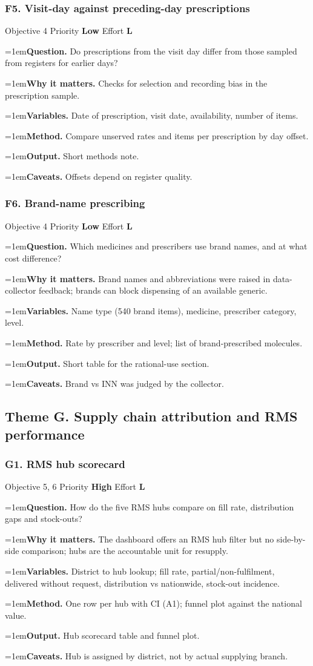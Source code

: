 \documentclass[10pt,a4paper]{article}
\newcommand{\field}[2]{\par\hangindent=1em\textbf{#1.} #2}
\begin{document}
\subsubsection*{F5. Visit-day against preceding-day prescriptions}
{\footnotesize\color{gray} Objective 4 \textperiodcentered{} Priority \textbf{Low} \textperiodcentered{} Effort \textbf{L}}
\field{Question}{Do prescriptions from the visit day differ from those sampled from registers for earlier days?}
\field{Why it matters}{Checks for selection and recording bias in the prescription sample.}
\field{Variables}{Date of prescription, visit date, availability, number of items.}
\field{Method}{Compare unserved rates and items per prescription by day offset.}
\field{Output}{Short methods note.}
\field{Caveats}{Offsets depend on register quality.}
\subsubsection*{F6. Brand-name prescribing}
{\footnotesize\color{gray} Objective 4 \textperiodcentered{} Priority \textbf{Low} \textperiodcentered{} Effort \textbf{L}}
\field{Question}{Which medicines and prescribers use brand names, and at what cost difference?}
\field{Why it matters}{Brand names and abbreviations were raised in data-collector feedback; brands can block dispensing of an available generic.}
\field{Variables}{Name type (540 brand items), medicine, prescriber category, level.}
\field{Method}{Rate by prescriber and level; list of brand-prescribed molecules.}
\field{Output}{Short table for the rational-use section.}
\field{Caveats}{Brand vs INN was judged by the collector.}
\subsection{Theme G. Supply chain attribution and RMS performance}
\subsubsection*{G1. RMS hub scorecard}
{\footnotesize\color{gray} Objective 5, 6 \textperiodcentered{} Priority \textbf{High} \textperiodcentered{} Effort \textbf{L}}
\field{Question}{How do the five RMS hubs compare on fill rate, distribution gaps and stock-outs?}
\field{Why it matters}{The dashboard offers an RMS hub filter but no side-by-side comparison; hubs are the accountable unit for resupply.}
\field{Variables}{District to hub lookup; fill rate, partial/non-fulfilment, delivered without request, distribution vs nationwide, stock-out incidence.}
\field{Method}{One row per hub with CI (A1); funnel plot against the national value.}
\field{Output}{Hub scorecard table and funnel plot.}
\field{Caveats}{Hub is assigned by district, not by actual supplying branch.}
\end{document}
